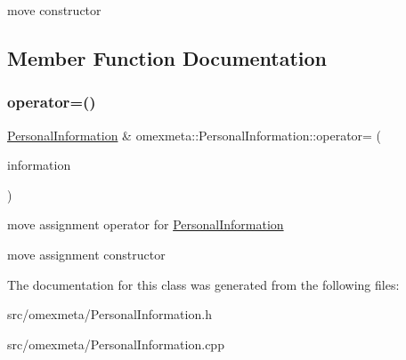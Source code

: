 move constructor 

\subsection{Member Function Documentation}
\mbox{\label{classomexmeta_1_1PersonalInformation_a048a3377b27d4b87681e4f8c24dd8c4f}} 
\subsubsection{\texorpdfstring{operator=()}{operator=()}}
{\footnotesize\ttfamily \hyperlink{classomexmeta_1_1PersonalInformation}{Personal\+Information} \& omexmeta\+::\+Personal\+Information\+::operator= (\begin{DoxyParamCaption}\item[{\hyperlink{classomexmeta_1_1PersonalInformation}{Personal\+Information} \&\&}]{information }\end{DoxyParamCaption})\hspace{0.3cm}{\ttfamily [noexcept]}}



move assignment operator for \hyperlink{classomexmeta_1_1PersonalInformation}{Personal\+Information} 

move assignment constructor 

The documentation for this class was generated from the following files\+:\begin{DoxyCompactItemize}
\item 
src/omexmeta/Personal\+Information.\+h\item 
src/omexmeta/Personal\+Information.\+cpp\end{DoxyCompactItemize}
